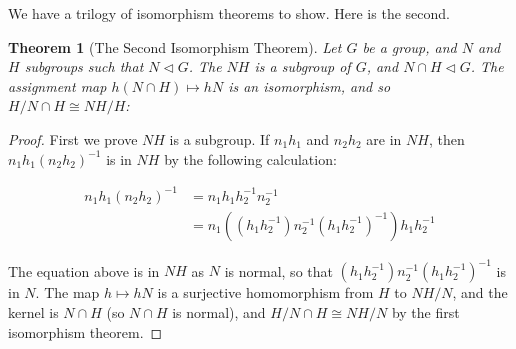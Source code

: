 \documentclass[12pt]{report}
\newtheorem{theorem}{Theorem}[section]
\begin{document}
We have a trilogy of isomorphism theorems to show. Here is the second.


\begin{center}
\end{center}

\begin{theorem}[The Second Isomorphism Theorem]
    Let $G$ be a group, and $N$ and $H$ subgroups such that $N \lhd G$. The $NH$ is a subgroup of $G$, and $N \cap H \lhd G$. The assignment map $h(N \cap H) \mapsto hN$ is an isomorphism, and so $H/N \cap H \cong NH/H$:
\end{theorem}
\begin{proof}
    First we prove $NH$ is a subgroup. If $n_1h_1$ and $n_2h_2$ are in $NH$, then $n_1h_1(n_2h_2)^{-1}$ is in $NH$ by the following calculation:

    \begin{align*}
    n_1h_1(n_2h_2)^{-1} &= n_1h_1h_2^{-1}n_2^{-1}\\
    &= n_1((h_1h_2^{-1})n_2^{-1}(h_1h_2^{-1})^{-1})h_1h_2^{-1}
    \end{align*}

    The equation above is in $NH$ as $N$ is normal, so that $(h_1h_2^{-1})n_2^{-1}(h_1h_2^{-1})^{-1}$ is in $N$. The map $h \mapsto hN$ is a surjective homomorphism from $H$ to $NH/N$, and the kernel is $N \cap H$ (so $N \cap H$ is normal), and $H/N \cap H \cong NH/N$ by the first isomorphism theorem.
\end{proof}
\end{document}

